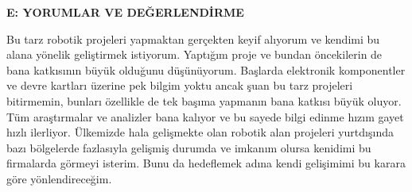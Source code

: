 \textbf{E: YORUMLAR VE DEĞERLENDİRME }
\label{BolumSonuc}

	Bu tarz robotik projeleri yapmaktan gerçekten keyif alıyorum ve kendimi bu alana yönelik geliştirmek istiyorum. Yaptığım proje ve bundan öncekilerin de bana katkısının büyük olduğunu düşünüyorum. Başlarda elektronik komponentler ve devre kartları üzerine pek bilgim yoktu ancak şuan bu tarz projeleri bitirmemin, bunları özellikle de tek başıma yapmanın bana katkısı büyük oluyor. Tüm araştırmalar ve analizler bana kalıyor ve bu sayede bilgi edinme hızım gayet hızlı ilerliyor. Ülkemizde hala gelişmekte olan robotik alan projeleri yurtdışında bazı bölgelerde fazlasıyla gelişmiş durumda ve imkanım olursa kenidimi bu firmalarda görmeyi isterim. Bunu da hedeflemek adına kendi gelişimimi bu karara göre yönlendireceğim.

\clearpage